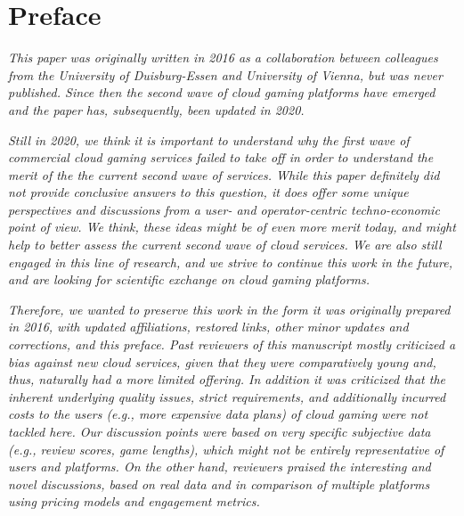 \section*{Preface}


\textit{This paper was originally written in 2016 as a collaboration between colleagues from the University of Duisburg-Essen and University of Vienna, but was never published. Since then the second wave of cloud gaming platforms have emerged and the paper has, subsequently, been updated in 2020.} 

\textit{Still in 2020, we think it is important to understand why the first wave of commercial cloud gaming services failed to take off in order to understand the merit of the the current second wave of services. 
While this paper definitely did not provide conclusive answers to this question, it does offer some unique perspectives and discussions from a user- and operator-centric techno-economic point of view.
We think, these ideas might be of even more merit today, and might help to better assess the current second wave of cloud services. We are also still engaged in this line of research, and we strive to continue this work in the future, and are looking for scientific exchange on cloud gaming platforms.} 

\textit{
Therefore, we wanted to preserve this work in the form it was originally prepared in 2016, with updated affiliations, restored links, other minor updates and corrections, and this preface. Past reviewers of this manuscript mostly criticized a bias against new cloud services, given that they were comparatively young and, thus, naturally had a more limited offering. In addition it was criticized that the inherent underlying quality issues, strict requirements, and additionally incurred costs to the users (e.g., more expensive data plans) of cloud gaming were not tackled here. Our discussion points were based on very specific subjective data (e.g., review scores, game lengths), which might not be entirely representative of users and platforms.
On the other hand, reviewers praised the interesting and novel discussions, based on real data and in comparison of multiple platforms using pricing models and engagement metrics.}
